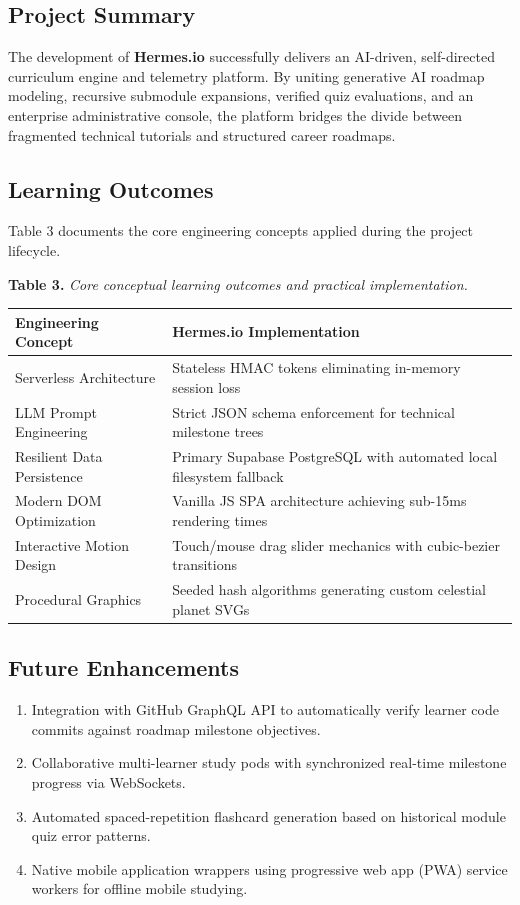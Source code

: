 \documentclass[12pt,a4paper]{article}
\begin{document}
\subsection{Project Summary}
The development of \textbf{Hermes.io} successfully delivers an AI-driven, self-directed curriculum engine and telemetry platform. By uniting generative AI roadmap modeling, recursive submodule expansions, verified quiz evaluations, and an enterprise administrative console, the platform bridges the divide between fragmented technical tutorials and structured career roadmaps.

\subsection{Learning Outcomes}
Table 3 documents the core engineering concepts applied during the project lifecycle.

\vspace{10pt}
\noindent
\textbf{Table 3.} \textit{Core conceptual learning outcomes and practical implementation.}
\vspace{4pt}

\noindent
{}
\begin{tabularx}{\textwidth}{l X}
\toprule
\rowcolor{tableHeadNavy}
\textbf{Engineering Concept} & \textbf{Hermes.io Implementation} \\
\midrule
Serverless Architecture & Stateless HMAC tokens eliminating in-memory session loss \\
LLM Prompt Engineering & Strict JSON schema enforcement for technical milestone trees \\
Resilient Data Persistence & Primary Supabase PostgreSQL with automated local filesystem fallback \\
Modern DOM Optimization & Vanilla JS SPA architecture achieving sub-15ms rendering times \\
Interactive Motion Design & Touch/mouse drag slider mechanics with cubic-bezier transitions \\
Procedural Graphics & Seeded hash algorithms generating custom celestial planet SVGs \\
\bottomrule
\end{tabularx}

\subsection{Future Enhancements}
\begin{enumerate}[leftmargin=1.5em, itemsep=5pt]
    \item Integration with GitHub GraphQL API to automatically verify learner code commits against roadmap milestone objectives.
    \item Collaborative multi-learner study pods with synchronized real-time milestone progress via WebSockets.
    \item Automated spaced-repetition flashcard generation based on historical module quiz error patterns.
    \item Native mobile application wrappers using progressive web app (PWA) service workers for offline mobile studying.
\end{enumerate}
\end{document}
